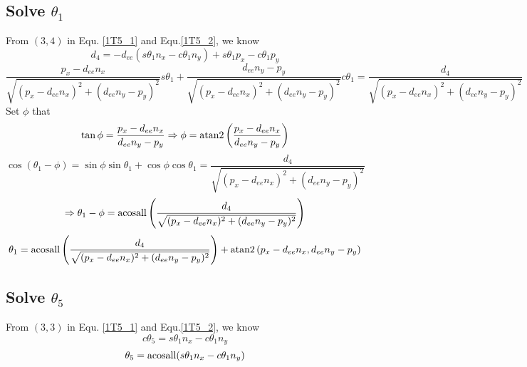 \documentclass[utf8]{article}
\begin{document}
\subsection{Solve $\theta_1$}
From $(3, 4)$ in Equ. \ref{1T5_1} and Equ.\ref{1T5_2}, we know
$$d_4 = -d_{ee}(s\theta_1n_x - c\theta_1n_y) + s\theta_1p_x - c\theta_1p_y$$
$$\frac{p_x - d_{ee}n_x}{\sqrt{(p_x - d_{ee}n_x)^2 + (d_{ee}n_y - p_y)^2}}s\theta_1 + \frac{d_{ee}n_y - p_y}{\sqrt{(p_x - d_{ee}n_x)^2 + (d_{ee}n_y - p_y)^2}}c\theta_1 = \frac{d_4}{\sqrt{(p_x - d_{ee}n_x)^2 + (d_{ee}n_y - p_y)^2}}$$
Set $\phi$ that 
$$\tan\phi = \frac{p_x - d_{ee}n_x}{d_{ee}n_y - p_y} \Rightarrow \phi = {\rm atan2}\left(\frac{p_x - d_{ee}n_x}{d_{ee}n_y - p_y}\right)$$
$$\cos(\theta_1 - \phi) = \sin\phi\sin\theta_1 + \cos\phi\cos\theta_1 = \frac{d_4}{\sqrt{(p_x - d_{ee}n_x)^2 + (d_{ee}n_y - p_y)^2}}$$
$$\Rightarrow \theta_1 - \phi = {\rm acosall}\left(\frac{d_4}{\sqrt{(p_x - d_{ee}n_x)^2 + (d_{ee}n_y - p_y)^2}}\right)$$
\begin{equation}
\theta_1 = {\rm acosall}\left(\frac{d_4}{\sqrt{(p_x - d_{ee}n_x)^2 + (d_{ee}n_y - p_y)^2}}\right) + {\rm atan2}\left(p_x - d_{ee}n_x, d_{ee}n_y - p_y\right)
\end{equation}

\subsection{Solve $\theta_5$}
From $(3, 3)$ in Equ. \ref{1T5_1} and Equ.\ref{1T5_2}, we know
$$c\theta_5 = s\theta_1n_x - c\theta_1 n_y$$
\begin{equation}
\theta_5 = {\rm acosall}(s\theta_1n_x - c\theta_1 n_y)
\end{equation}
\end{document}
